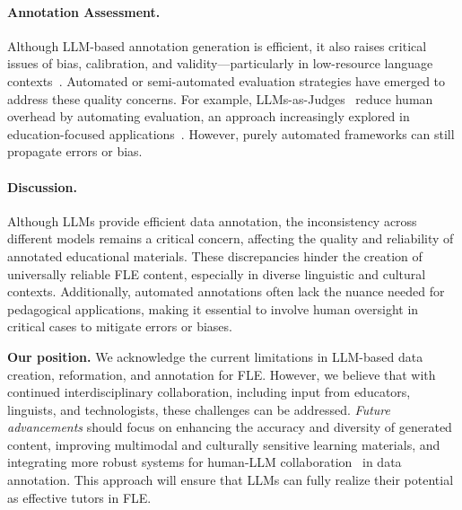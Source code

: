 \paragraph{Annotation Assessment.} Although LLM-based annotation generation is efficient, it also raises critical issues of bias, calibration, and validity—particularly in low-resource language contexts~\cite{bhat-varma-2023-large,jadhav2024limitations}. Automated or semi-automated evaluation strategies have emerged to address these quality concerns. For example, LLMs-as-Judges~\cite{li2024generation,li2024llms,gu2024survey} reduce human overhead by automating evaluation, an approach increasingly explored in education-focused applications~\cite{chiang-etal-2024-large,zhou-etal-2024-llm}. However, purely automated frameworks can still propagate errors or bias.


\paragraph{Discussion.} Although LLMs provide efficient data annotation, the inconsistency across different models remains a critical concern, affecting the quality and reliability of annotated educational materials. These discrepancies hinder the creation of universally reliable FLE content, especially in diverse linguistic and cultural contexts. Additionally, automated annotations often lack the nuance needed for pedagogical applications, making it essential to involve human oversight in critical cases to mitigate errors or biases.

\begin{tcolorbox}[top=1pt, bottom=1pt, left=1pt, right=1pt]
\textbf{Our position.} We acknowledge the current limitations in LLM-based data creation, reformation, and annotation for FLE. However, we believe that with continued interdisciplinary collaboration, including input from educators, linguists, and technologists, these challenges can be addressed. \textit{Future advancements} should focus on enhancing the accuracy and diversity of generated content, improving multimodal and culturally sensitive learning materials, and integrating more robust systems for human-LLM collaboration~\cite{li-etal-2023-coannotating,wang2024human} in data annotation. This approach will ensure that LLMs can fully realize their potential as effective tutors in FLE.
\end{tcolorbox}

